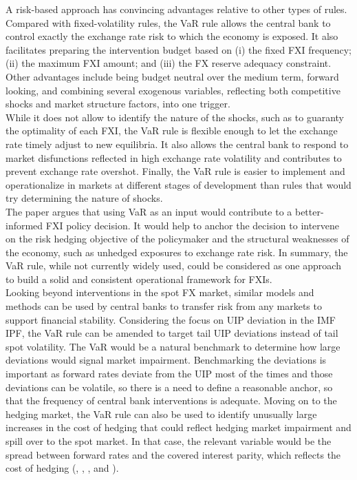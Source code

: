 \documentclass[11pt]{article}
\begin{document}
A risk-based  approach has  convincing advantages relative  to other  types of
rules. Compared with  fixed-volatility rules, the VaR rule  allows the central
bank  to control  exactly  the exchange  rate  risk to  which  the economy  is
exposed. It  also facilitates preparing  the intervention budget based  on (i)
the fixed FXI frequency; (ii) the maximum FXI amount; and (iii) the FX reserve
adequacy constraint.  Other  advantages include being budget  neutral over the
medium  term,  forward looking,  and  combining  several exogenous  variables,
reflecting  both competitive  shocks and  market structure  factors, into  one
trigger.\\

While it  does not  allow to  identify the nature  of the  shocks, such  as to
guaranty the optimality  of each FXI, the  VaR rule is flexible  enough to let
the exchange rate timely adjust to  new equilibria. It also allows the central
bank  to  respond to  market  disfunctions  reflected  in high  exchange  rate
volatility and contributes to prevent exchange rate overshot. Finally, the VaR
rule is easier to implement and  operationalize in markets at different stages
of development than rules that would try determining the nature of shocks.\\

The  paper  argues  that  using  VaR   as  an  input  would  contribute  to  a
better-informed FXI policy decision.  It would  help to anchor the decision to
intervene on the risk hedging objective  of the policymaker and the structural
weaknesses  of  the economy,  such  as  unhedged  exposures to  exchange  rate
risk. In  summary, the  VaR rule,  while not currently  widely used,  could be
considered  as  one approach  to  build  a  solid and  consistent  operational
framework for FXIs.\\

Looking beyond interventions in the spot FX market, similar models and methods
can be  used by  central banks to  transfer risk from  any markets  to support
financial stability.  Considering  the focus on UIP deviation in  the IMF IPF,
the VaR rule can be amended to target tail UIP deviations instead of tail spot
volatility.   The VaR  would be  a natural  benchmark to  determine how  large
deviations  would signal  market  impairment. Benchmarking  the deviations  is
important as forward  rates deviate from the  UIP most of the  times and those
deviations can be volatile, so there is  a need to define a reasonable anchor,
so that the frequency of central  bank interventions is adequate. Moving on to
the hedging market, the VaR rule can  also be used to identify unusually large
increases in the cost of hedging  that could reflect hedging market impairment
and spill over to  the spot market. In that case,  the relevant variable would
be the  spread between forward  rates and  the covered interest  parity, which
reflects   the   cost   of  hedging   (\cite{borio2016},   \cite{cerutti2019},
\cite{du2018}, and \cite{eguren2018}).\\
\end{document}
